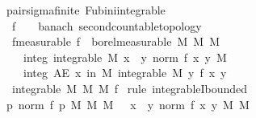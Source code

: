 \documentclass{article}
\theoremstyle{definition}
\begin{document}
\begin{figure}
\begin{isabellebody}
\isamarkupfalse%
\ {\isacharparenleft}\ pair{\isacharunderscore}sigma{\isacharunderscore}finite{\isacharparenright}\ Fubini{\isacharunderscore}integrable{\isacharcolon}\isanewline
\ \ \ f\ {\isacharcolon}{\isacharcolon}\ {\isachardoublequoteopen}{\isacharunderscore}\ {\isasymRightarrow}\ {\isacharunderscore}{\isacharcolon}{\isacharcolon}{\isacharbraceleft}banach{\isacharcomma}\ second{\isacharunderscore}countable{\isacharunderscore}topology{\isacharbraceright}{\isachardoublequoteclose}\isanewline
\ \ \ f{\isacharbrackleft}measurable{\isacharbrackright}{\isacharcolon}\ {\isachardoublequoteopen}f\ {\isasymin}\ borel{\isacharunderscore}measurable\ {\isacharparenleft}M{}\ {\isasymOtimes}\isactrlsub M\ M{}{\isacharparenright}{\isachardoublequoteclose}\isanewline
\ \ \ \ \ integ{}{\isacharcolon}\ {\isachardoublequoteopen}integrable\ M{}\ {\isacharparenleft}{\isasymlambda}x{\isachardot}\ {\isasymintegral}\ y{\isachardot}\ norm\ {\isacharparenleft}f\ {\isacharparenleft}x{\isacharcomma}\ y{\isacharparenright}{\isacharparenright}\ {\isasympartial}M{}{\isacharparenright}{\isachardoublequoteclose}\isanewline
\ \ \ \ \ integ{}{\isacharcolon}\ {\isachardoublequoteopen}AE\ x\ in\ M{}{\isachardot}\ integrable\ M{}\ {\isacharparenleft}{\isasymlambda}y{\isachardot}\ f\ {\isacharparenleft}x{\isacharcomma}\ y{\isacharparenright}{\isacharparenright}{\isachardoublequoteclose}\isanewline
\ \ \ {\isachardoublequoteopen}integrable\ {\isacharparenleft}M{}\ {\isasymOtimes}\isactrlsub M\ M{}{\isacharparenright}\ f{\isachardoublequoteclose}\isanewline
{}\isamarkupfalse%
\ {\isacharparenleft}rule\ integrableI{\isacharunderscore}bounded{\isacharparenright}\isanewline
\ \ \isamarkupfalse%
\ {\isachardoublequoteopen}{\isacharparenleft}{\isasymintegral}\isactrlsup {\isacharplus}\ p{\isachardot}\ norm\ {\isacharparenleft}f\ p{\isacharparenright}\ {\isasympartial}{\isacharparenleft}M{}\ {\isasymOtimes}\isactrlsub M\ M{}{\isacharparenright}{\isacharparenright}\ {\isacharequal}\ {\isacharparenleft}{\isasymintegral}\isactrlsup {\isacharplus}\ x{\isachardot}\ {\isacharparenleft}{\isasymintegral}\isactrlsup {\isacharplus}\ y{\isachardot}\ norm\ {\isacharparenleft}f\ {\isacharparenleft}x{\isacharcomma}\ y{\isacharparenright}{\isacharparenright}\ {\isasympartial}M{}{\isacharparenright}\ {\isasympartial}M{}{\isacharparenright}{\isachardoublequoteclose}\isanewline

\end{isabellebody}
\end{figure}
\end{document}
